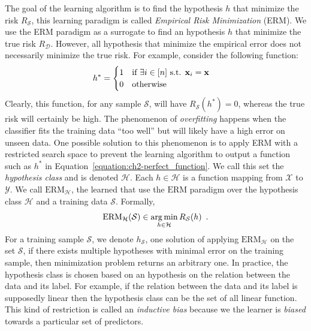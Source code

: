 \noindent
The goal of the learning algorithm is to find the hypothesis $h$ that minimize the risk $R_{\mathcal{S}}$, this learning paradigm is called \emph{Empirical Risk Minimization} (ERM).
We use the ERM paradigm as a surrogate to find an hypothesis $h$ that minimize the true risk $R_\mathcal{D}$.
However, all hypothesis that minimize the empirical error does not necessarily minimize the true risk.
For example, consider the following function:
\begin{equation}
  h^* =
  \begin{cases}
    1 \quad \text{if }\exists i \in [n] \text{ s.t. } \mathbf{x}_i  = \mathbf{x} \\
    0 \quad \text{otherwise}
  \end{cases}
  \label{equation:ch2-perfect_function}
\end{equation}
Clearly, this function, for any sample $\mathcal{S}$, will have $R_\mathcal{S}(h^*) = 0$, whereas the true risk will certainly be high.
The phenomenon of \emph{overfitting} happens when the classifier fits the training data ``too well'' but will likely have a high error on unseen data.
One possible solution to this phenomenon is to apply ERM with a restricted search space to prevent the learning algorithm to output a function such as $h^*$ in Equation~\ref{equation:ch2-perfect_function}.
We call this set the \emph{hypothesis class} and is denoted $\mathcal{H}$. 
Each $h \in \mathcal{H}$ is a function mapping from $\mathcal{X}$ to $\mathcal{Y}$.
We call $\mathrm{ERM}_{\mathcal{H}}$, the learned that use the $\mathrm{ERM}$ paradigm over the hypothesis class $\mathcal{H}$ and a training data $\mathcal{S}$.
Formally,
\begin{equation}
  \mathrm{ERM}_{\mathcal{H}}(\mathcal{S}) \in \operatorname*{arg\,min}_{h \in \mathcal{H}} R_{\mathcal{S}}(h) \enspace.
\end{equation}
For a training sample $\mathcal{S}$, we denote $h_\mathcal{S}$, one solution of applying $\text{ERM}_\mathcal{H}$ on the set $\mathcal{S}$, if there exists multiple hypotheses with minimal error on the training sample, then minimization problem returns an arbitrary one.
In practice, the hypothesis class is chosen based on an hypothesis on the relation between the data and its label.
For example, if the relation between the data and its label is supposedly linear then the hypothesis class can be the set of all linear function.
This kind of restriction is called an \emph{inductive bias} because we the learner is \emph{biased} towards a particular set of predictors.


